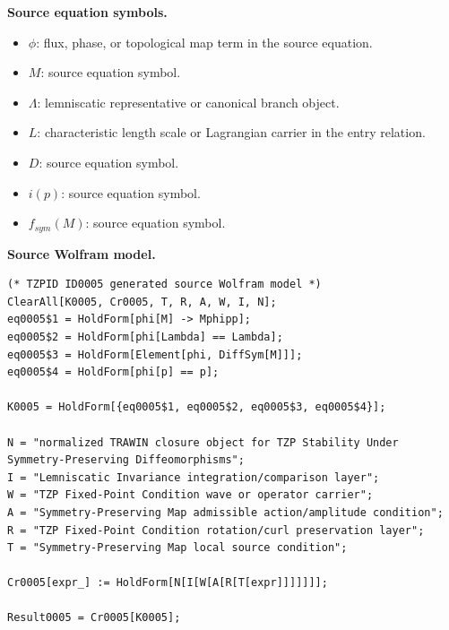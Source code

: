 \begin{minipage}[t]{0.49\linewidth}
\begingroup
\small
\raggedright
\textbf{Source equation symbols.}\par
\begin{itemize}[leftmargin=1.35em,itemsep=1pt,topsep=1pt,parsep=0pt]
    \item $\phi$: flux, phase, or topological map term in the source equation.
    \item $M$: source equation symbol.
    \item $\Lambda$: lemniscatic representative or canonical branch object.
    \item $L$: characteristic length scale or Lagrangian carrier in the entry relation.
    \item $D$: source equation symbol.
    \item $i(p)$: source equation symbol.
    \item $f_{sym}(M)$: source equation symbol.
\end{itemize}
\endgroup
\end{minipage}\hfill
\begin{minipage}[t]{0.47\linewidth}
\begingroup
\scriptsize
\raggedright
\textbf{Source Wolfram model.}\par
\begin{Verbatim}[fontsize=\tiny,breaklines=true,breakanywhere=true]
(* TZPID ID0005 generated source Wolfram model *)
ClearAll[K0005, Cr0005, T, R, A, W, I, N];
eq0005$1 = HoldForm[phi[M] -> Mphipp];
eq0005$2 = HoldForm[phi[Lambda] == Lambda];
eq0005$3 = HoldForm[Element[phi, DiffSym[M]]];
eq0005$4 = HoldForm[phi[p] == p];

K0005 = HoldForm[{eq0005$1, eq0005$2, eq0005$3, eq0005$4}];

N = "normalized TRAWIN closure object for TZP Stability Under Symmetry-Preserving Diffeomorphisms";
I = "Lemniscatic Invariance integration/comparison layer";
W = "TZP Fixed-Point Condition wave or operator carrier";
A = "Symmetry-Preserving Map admissible action/amplitude condition";
R = "TZP Fixed-Point Condition rotation/curl preservation layer";
T = "Symmetry-Preserving Map local source condition";

Cr0005[expr_] := HoldForm[N[I[W[A[R[T[expr]]]]]]];

Result0005 = Cr0005[K0005];
\end{Verbatim}
\endgroup
\end{minipage}

